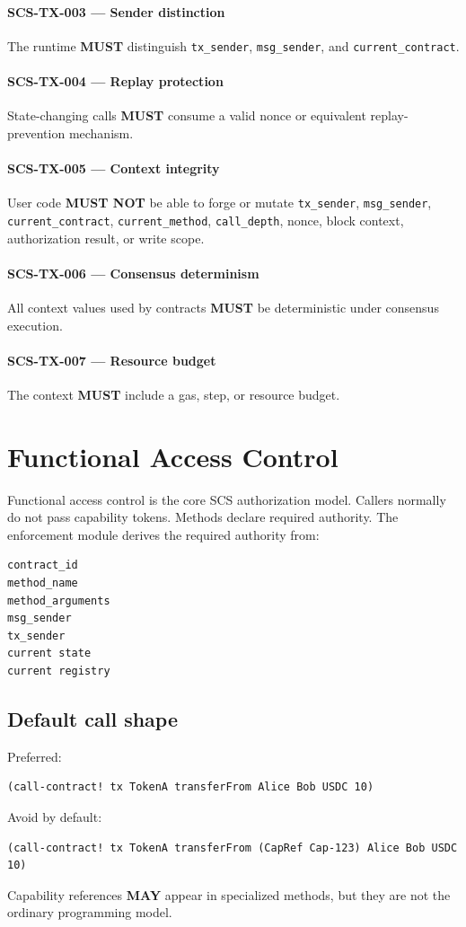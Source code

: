 \documentclass[11pt]{article}
\newcommand{\SCS}{\textsc{SCS}}
\newcommand{\MUST}{\textbf{MUST}}
\newcommand{\MUSTNOT}{\textbf{MUST NOT}}
\newcommand{\MAY}{\textbf{MAY}}
\newcommand{\req}[2]{\paragraph{#1}#2\par}
\newcommand{\code}[1]{\texttt{#1}}
\begin{document}
\req{SCS-TX-003 --- Sender distinction}{The runtime \MUST{} distinguish \code{tx\_sender}, \code{msg\_sender}, and \code{current\_contract}.}

\req{SCS-TX-004 --- Replay protection}{State-changing calls \MUST{} consume a valid nonce or equivalent replay-prevention mechanism.}

\req{SCS-TX-005 --- Context integrity}{User code \MUSTNOT{} be able to forge or mutate \code{tx\_sender}, \code{msg\_sender}, \code{current\_contract}, \code{current\_method}, \code{call\_depth}, nonce, block context, authorization result, or write scope.}

\req{SCS-TX-006 --- Consensus determinism}{All context values used by contracts \MUST{} be deterministic under consensus execution.}

\req{SCS-TX-007 --- Resource budget}{The context \MUST{} include a gas, step, or resource budget.}



\section{Functional Access Control}

Functional access control is the core \SCS{} authorization model. Callers normally do not pass capability tokens. Methods declare required authority. The enforcement module derives the required authority from:

\begin{lstlisting}
contract_id
method_name
method_arguments
msg_sender
tx_sender
current state
current registry
\end{lstlisting}

\subsection{Default call shape}

Preferred:

\begin{lstlisting}
(call-contract! tx TokenA transferFrom Alice Bob USDC 10)
\end{lstlisting}

Avoid by default:

\begin{lstlisting}
(call-contract! tx TokenA transferFrom (CapRef Cap-123) Alice Bob USDC 10)
\end{lstlisting}

Capability references \MAY{} appear in specialized methods, but they are not the ordinary programming model.
\end{document}
